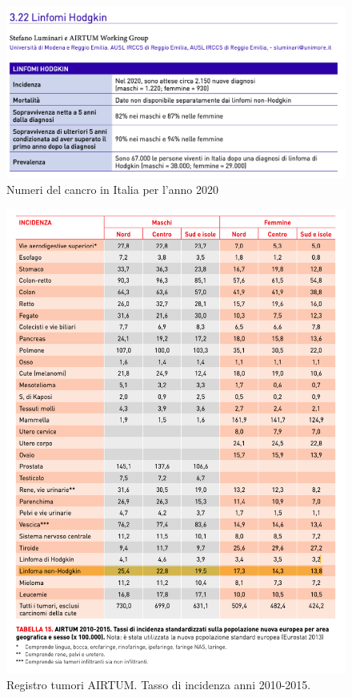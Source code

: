 \begin{figure}[H]
    \begin{center}
    \includegraphics[width=0.8\columnwidth]{img/2020.png}
    \end{center}
    \caption[Numeri del cancro in Italia per l’anno 2020]{Numeri del cancro in Italia per l’anno 2020
    \cite{img5}}

\end{figure}

\begin{figure}[H]
    \begin{center}
    \includegraphics[width=0.8\columnwidth]{img/INCIDENZA.png}
    \end{center}
    \caption[Registro tumori AIRTUM. Tasso di incidenza anni 2010-2015.]{Registro tumori AIRTUM. Tasso di incidenza anni 2010-2015.
    \cite{img6}}

\end{figure}

